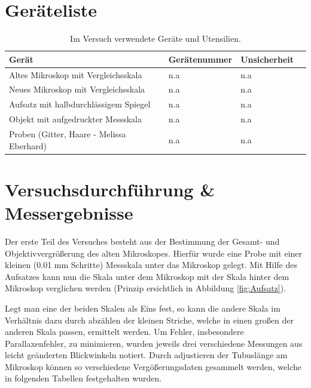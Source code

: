 \documentclass[12pt,a4paper,twoside]{article}
\begin{document}
\section{Geräteliste} %

    \begin{table}[H]
        \centering
        \caption{Im Versuch verwendete Geräte und Utensilien.}
        \label{tab:geraete}
        \begin{tabular}{| l | l | l | l |}
            \hline
            Gerät & Gerätenummer  & Unsicherheit \\
            \hline
            Altes Mikroskop mit Vergleichsskala & {n.a} & {n.a} \\
            Neues Mikroskop mit Vergleichsskala & {n.a} & {n.a} \\
            Aufsatz mit halbdurchlässigem Spiegel & {n.a} & {n.a} \\
            Objekt mit aufgedruckter Messskala & {n.a} & {n.a} \\
            Proben (Gitter, Haare - Melissa Eberhard) & {n.a} & {n.a} \\
            \hline
        \end{tabular}
    \end{table}


\section{Versuchsdurchführung \& Messergebnisse} %

Der erste Teil des Versuches besteht aus der Bestimmung der Gesamt- und Objektivvergrößerung des alten Mikroskopes.
Hierfür wurde eine Probe mit einer kleinen (0.01 mm Schritte) Messskala unter das Mikroskop gelegt. 
Mit Hilfe des Aufsatzes kann nun die Skala unter dem Mikroskop mit der Skala hinter dem Mikroskop verglichen werden (Prinzip ersichtlich in Abbildung \ref{fig:Aufsatz}). \newline

\noindent
Legt man eine der beiden Skalen als Eins fest, so kann die andere Skala im Verhältnis dazu durch abzählen der kleinen Striche, welche in einen großen der anderen Skala passen, ermittelt werden.
Um Fehler, insbesondere Parallaxenfehler, zu minimieren, wurden jeweils drei verschiedene Messungen aus leicht geänderten Blickwinkeln notiert.
Durch adjustieren der Tubuslänge am Mikroskop können so verschiedene Vergößerungsdaten gesammelt werden, welche in folgenden Tabellen festgehalten wurden.
\end{document}
